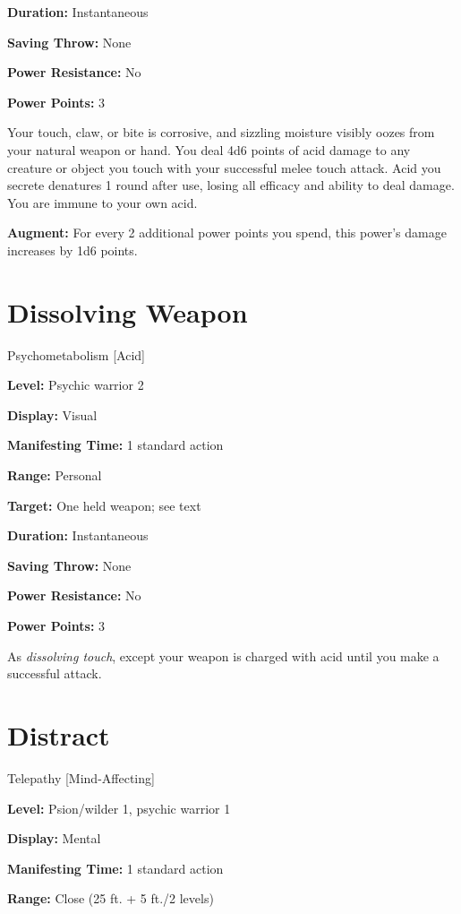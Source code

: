 \documentclass{article}
\begin{document}
\textbf{Duration:} Instantaneous

\textbf{Saving Throw:} None

\textbf{Power Resistance:} No

\textbf{Power Points:} 3

Your touch, claw, or bite is corrosive, and sizzling moisture visibly oozes from 
your natural weapon or hand. You deal 4d6 points of acid damage to any creature 
or object you touch with your successful melee touch attack. Acid you secrete denatures 
1 round after use, losing all efficacy and ability to deal damage. You are immune 
to your own acid.

\textbf{Augment:} For every 2 additional power points you spend, this power's damage 
increases by 1d6 points.

\vspace{12pt}
\section*{Dissolving Weapon}

Psychometabolism [Acid]

\textbf{Level:} Psychic warrior 2

\textbf{Display:} Visual

\textbf{Manifesting Time:} 1 standard action

\textbf{Range:} Personal

\textbf{Target:} One held weapon; see text

\textbf{Duration:} Instantaneous

\textbf{Saving Throw:} None

\textbf{Power Resistance:} No

\textbf{Power Points:} 3

As \textit{dissolving touch}, except your weapon is charged with acid until you 
make a successful attack.

\vspace{12pt}
\section*{Distract}

Telepathy [Mind-Affecting]

\textbf{Level:} Psion/wilder 1, psychic warrior 1

\textbf{Display:} Mental

\textbf{Manifesting Time:} 1 standard action

\textbf{Range:} Close (25 ft. + 5 ft./2 levels)
\end{document}
